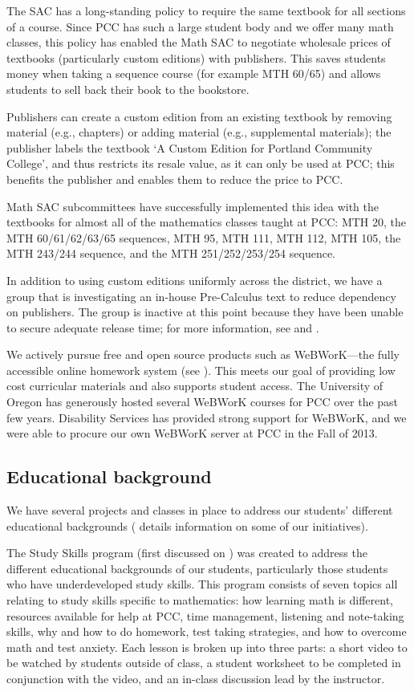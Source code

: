 The SAC has a long-standing policy to require the same textbook for all
sections of a course. Since PCC has such a large student body and we offer many
math classes, this policy has enabled the Math SAC to negotiate wholesale
prices of textbooks (particularly custom editions) with publishers.  This saves
students money when taking a sequence course (for example MTH 60/65) and allows
students to sell back their book to the bookstore.

Publishers can create a custom edition from an existing textbook by removing
material (e.g., chapters) or adding material (e.g., supplemental materials);
the publisher labels the textbook `A Custom Edition for Portland Community
College', and thus restricts its resale value, as it can only be used at PCC;
this benefits the publisher and enables them to reduce the price to PCC.

Math SAC subcommittees have successfully implemented this idea with the
textbooks for almost all of the mathematics classes taught at PCC: MTH 20, the
MTH 60/61/62/63/65 sequences, MTH 95, MTH 111, MTH 112, MTH 105, the MTH 243/244
sequence, and the MTH 251/252/253/254 sequence.

In addition to using custom editions uniformly across the district, we have a
group that is investigating an in-house Pre-Calculus text to reduce dependency
on publishers. The group is inactive at this point because they have been
unable to secure adequate release time; for more information, see
 and \cite{mth111project}.

We actively pursue free and open source products such as WeBWorK---the fully
accessible online homework system (see ). This
meets our goal of providing low cost curricular materials and also supports
student access. The University of Oregon has generously hosted several WeBWorK
courses for PCC over the past few years.  Disability Services has provided
strong support for WeBWorK, and we were able to procure our own WeBWorK server
at PCC in the Fall of 2013.

\subsection{Educational background}
We have several projects and classes in place to address our students'
different educational backgrounds ( details information on
some of our initiatives).

The Study Skills program (first discussed on )
was created to address the different educational
backgrounds of our students, particularly those students who have
underdeveloped study skills. This program consists of seven topics all relating
to study skills specific to mathematics: how learning math is different,
resources available for help at PCC, time management, listening and note-taking
skills, why and how to do homework, test taking strategies, and how to overcome
math and test anxiety.  Each lesson is broken up into three parts: a short
video to be watched by students outside of class, a student worksheet to be
completed in conjunction with the video, and an in-class discussion lead by the
instructor.

